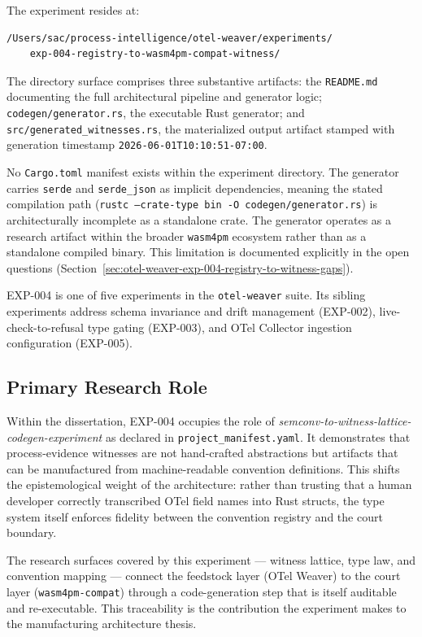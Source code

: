 The experiment resides at:
\begin{verbatim}
/Users/sac/process-intelligence/otel-weaver/experiments/
    exp-004-registry-to-wasm4pm-compat-witness/
\end{verbatim}

The directory surface comprises three substantive artifacts: the \texttt{README.md}
documenting the full architectural pipeline and generator logic; \texttt{codegen/generator.rs},
the executable Rust generator; and \texttt{src/generated\_witnesses.rs}, the materialized
output artifact stamped with generation timestamp \texttt{2026-06-01T10:10:51-07:00}.

No \texttt{Cargo.toml} manifest exists within the experiment directory. The generator
carries \texttt{serde} and \texttt{serde\_json} as implicit dependencies, meaning the
stated compilation path (\texttt{rustc --crate-type bin -O codegen/generator.rs}) is
architecturally incomplete as a standalone crate. The generator operates as a research
artifact within the broader \texttt{wasm4pm} ecosystem rather than as a standalone compiled
binary. This limitation is documented explicitly in the open questions
(Section~\ref{sec:otel-weaver-exp-004-registry-to-witness-gaps}).

EXP-004 is one of five experiments in the \texttt{otel-weaver} suite. Its sibling
experiments address schema invariance and drift management (EXP-002), live-check-to-refusal
type gating (EXP-003), and OTel Collector ingestion configuration (EXP-005).

\subsection{Primary Research Role}
\label{sec:otel-weaver-exp-004-registry-to-witness-role}

Within the dissertation, EXP-004 occupies the role of
\emph{semconv-to-witness-lattice-codegen-experiment} as declared in
\texttt{project\_manifest.yaml}. It demonstrates that process-evidence witnesses are not
hand-crafted abstractions but artifacts that can be manufactured from machine-readable
convention definitions. This shifts the epistemological weight of the architecture: rather
than trusting that a human developer correctly transcribed OTel field names into Rust
structs, the type system itself enforces fidelity between the convention registry and the
court boundary.

The research surfaces covered by this experiment --- witness lattice, type law, and
convention mapping --- connect the feedstock layer (OTel Weaver) to the court layer
(\texttt{wasm4pm-compat}) through a code-generation step that is itself auditable and
re-executable. This traceability is the contribution the experiment makes to the
manufacturing architecture thesis.

